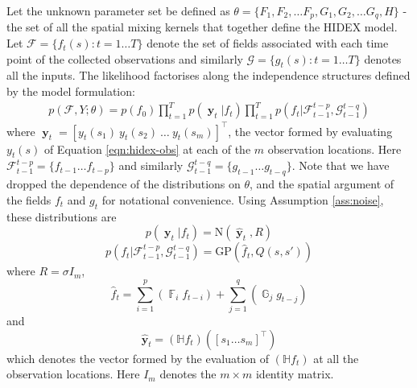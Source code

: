 \documentclass{IEEEtran}
\newcommand{\GP}[2]{\mathrm{GP}(#1,#2)}
\newcommand{\N}[2]{\mathrm{N}(#1,#2)}
\DeclareMathOperator{\F}{\mathbb{F}}
\DeclareMathOperator{\G}{\mathbb{G}}
\DeclareMathOperator{\yvec}{\mathbf{y}}
\begin{document}
Let the unknown parameter set be defined as $\theta = \{F_1, F_2, \ldots F_p, G_1,G_2,\ldots G_q, H\}$ - the set of all the spatial mixing kernels that together define the HIDEX model. Let $\mathcal{F} = \{f_t(s) : t = 1 \ldots T\}$ denote the set of fields associated with each time point of the collected observations and similarly $\mathcal{G} = \{g_t(s) : t = 1 \ldots T\}$ denotes all the inputs. The likelihood factorises along the independence structures defined by the model formulation:
\begin{equation}
	\begin{split}
	p(\mathcal{F}, Y;\theta) =  p(f_0) \prod_{t=1}^T p(\yvec_t|f_t)
	\prod_{t=1}^T  p(f_t|\mathcal{F}_{t-1}^{t-p}, \mathcal{G}_{t-1}^{t-q}) 
	\end{split}
\end{equation}
where $\yvec_t = [y_t(s_1) ~ y_t(s_2) ~ \ldots ~ y_t(s_m)]^\top$, the vector formed by evaluating $y_t(s)$ of Equation \ref{eqn:hidex-obs} at each of the $m$ observation locations. Here $\mathcal{F}_{t-1}^{t-p} = \{f_{t-1} \ldots f_{t-p}\}$ and similarly $\mathcal{G}_{t-1}^{t-q}= \{g_{t-1} \ldots g_{t-q}\}$. Note that we have dropped the dependence of the distributions on $\theta$, and the spatial argument of the fields $f_t$ and $g_t$ for notational convenience. Using Assumption \ref{ass:noise}, these distributions are
\begin{equation}
	\label{eqn:ydist}
	p(\yvec_t|f_t) = \N{\hat{\yvec}_t}{R}
\end{equation}
\begin{equation}
	\label{eqn:fdist}
	p(f_t|\mathcal{F}_{t-1}^{t-p}, \mathcal{G}_{t-1}^{t-q}) = \GP{ \hat{f}_t}{Q(s,s')}
\end{equation}
where $R = \sigma I_m$,
\begin{equation}
	\hat{f}_t =\sum_{i=1}^{p}( \F_i f_{t-i}) + \sum_{j=1}^{q}(\G_j g_{t-j})
\end{equation}
and 
\begin{equation}
	\hat{\mathbf{y}}_t = (\mathbb{H}f_t)([s_1 \ldots s_m]^\top)
\end{equation}
which denotes the vector formed by the evaluation of $(\mathbb{H}f_t)$ at all the observation locations. Here $I_m$ denotes the $m\times m$ identity matrix.
\end{document}
